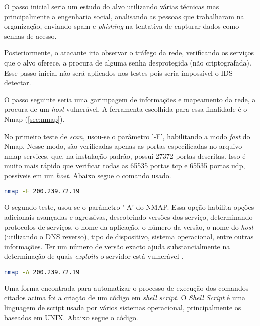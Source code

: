 O passo inicial seria um estudo do alvo utilizando várias técnicas mas principalmente a engenharia social, analisando as pessoas que trabalharam na organização, enviando spam e \textit{phishing} na tentativa de capturar dados como senhas de acesso. 

Posteriormente, o atacante iria observar o tráfego da rede, verificando os serviços que o alvo oferece, a procura de alguma senha desprotegida (não criptografada). Esse passo inicial não será aplicados nos testes pois seria impossível o IDS detectar.

O passo seguinte seria uma garimpagem de informações e mapeamento da rede, a procura de um \textit{host} vulnerável. A ferramenta escolhida para essa finalidade é o Nmap (\autoref{sec:nmap}). 

No primeiro teste de \textit{scan}, usou-se o parâmetro '-F', habilitando a modo \textit{fast} do Nmap. Nesse modo, são verificadas apenas as portas especificadas no arquivo nmap-services, que, na instalação padrão, possui 27372 portas descritas. Isso é muito mais rápido que verificar todas as 65535 portas tcp e 65535 portas udp, possíveis em um \textit{host}. Abaixo segue o comando usado.

\begin{lstlisting}[caption={Comando NMAP no modo \textit{fast}},language=bash, frame=single, label={lst:nmap-F}]
    nmap -F 200.239.72.19
\end{lstlisting}

O segundo teste, usou-se o parâmetro '-A' do NMAP. Essa opção habilita opções adicionais avançadas e agressivas, descobrindo versões dos serviço, determinando protocolos de serviços, o nome da aplicação, o número da versão, o nome do \textit{host} (utilizando o DNS reverso), tipo de dispositivo, sistema operacional, entre outras informações. Ter um número de versão exacto ajuda substancialmente na determinação de quais \textit{exploits} o servidor está vulnerável \cite{nmap}.

\begin{lstlisting}[caption={Comando NMAP no modo de descoberta de versões},language=bash, frame=single, label={lst:nmap-sv}]  
    nmap -A 200.239.72.19
\end{lstlisting}

Uma forma encontrada para automatizar o processo de execução dos comandos citados acima foi a criação de um código em \textit{shell script}. O \textit{Shell Script} é uma linguagem de script usada por vários sistemas operacional, principalmente os baseados em UNIX. Abaixo segue o código.

